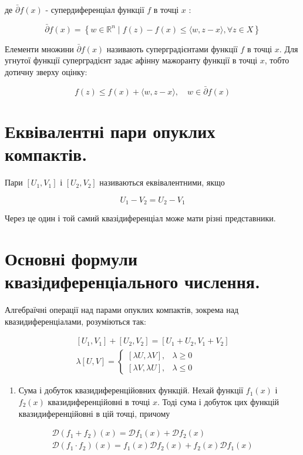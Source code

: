 \documentclass[10pt]{article}
\begin{document}
де $\bar{\partial} f(x)$ - супердиференціал функції $f$ в точці $x$ :

$$
\bar{\partial} f(x)=\left\{w \in \mathbb{R}^{n} \mid f(z)-f(x) \leq\langle w, z-x\rangle, \forall z \in X\right\}
$$

Елементи множини $\bar{\partial} f(x)$ називають суперградієнтами функції $f$ в точці $x$. Для угнутої функції суперградієнт задає афінну мажоранту функції в точці $x$, тобто дотичну зверху оцінку:

$$
f(z) \leq f(x)+\langle w, z-x\rangle, \quad w \in \bar{\partial} f(x)
$$

\section*{Еквівалентні пари опуклих компактів.}
Пари $\left[U_{1}, V_{1}\right]$ і $\left[U_{2}, V_{2}\right]$ називаються еквівалентними, якщо

$$
U_{1}-V_{2}=U_{2}-V_{1}
$$

Через це один і той самий квазідиференціал може мати різні представники.

\section*{Основні формули квазідиференціального числення.}
Алгебраїчні операції над парами опуклих компактів, зокрема над квазидиференціалами, розуміються так:

$$
\begin{gathered}
{\left[U_{1}, V_{1}\right]+\left[U_{2}, V_{2}\right]=\left[U_{1}+U_{2}, V_{1}+V_{2}\right]} \\
\lambda[U, V]= \begin{cases}{[\lambda U, \lambda V],} & \lambda \geq 0 \\
{[\lambda V, \lambda U],} & \lambda \leq 0\end{cases}
\end{gathered}
$$

\begin{enumerate}
  \item Сума і добуток квазидиференційовних функцій. Нехай функції $f_{1}(x)$ і $f_{2}(x)$ квазидиференційовні в точці $x$. Тоді сума і добуток цих функцій квазидиференційовні в цій точці, причому
\end{enumerate}

$$
\begin{gathered}
\mathcal{D}\left(f_{1}+f_{2}\right)(x)=\mathcal{D} f_{1}(x)+\mathcal{D} f_{2}(x) \\
\mathcal{D}\left(f_{1} \cdot f_{2}\right)(x)=f_{1}(x) \mathcal{D} f_{2}(x)+f_{2}(x) \mathcal{D} f_{1}(x)
\end{gathered}
$$
\end{document}
